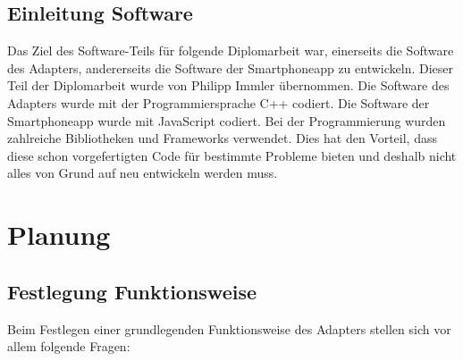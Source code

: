 \documentclass[11pt, twoside]{article}
\begin{document}
\subsection{Einleitung Software}
Das Ziel des Software-Teils für folgende Diplomarbeit war, einerseits die Software des Adapters, andererseits die Software der Smartphoneapp zu entwickeln. Dieser Teil der Diplomarbeit wurde von Philipp Immler übernommen. Die Software des Adapters wurde mit der Programmiersprache C++ codiert. Die Software der Smartphoneapp wurde mit JavaScript codiert. Bei der Programmierung wurden zahlreiche Bibliotheken und Frameworks verwendet. Dies hat den Vorteil, dass diese schon vorgefertigten Code für bestimmte Probleme bieten und deshalb nicht alles von Grund auf neu entwickeln werden muss.

\section{Planung}
\subsection{Festlegung Funktionsweise}
Beim Festlegen einer grundlegenden Funktionsweise des Adapters stellen sich vor allem folgende Fragen:
\end{document}
